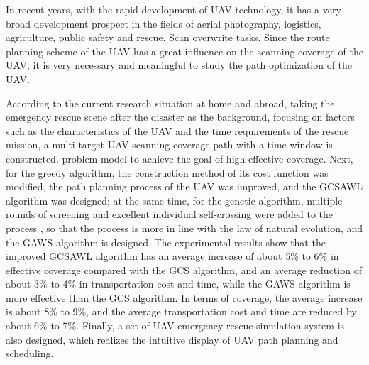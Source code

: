 \begin{eabstract}
In recent years, with the rapid development of UAV technology, it has a very broad development prospect in the fields of aerial photography, logistics, agriculture, public safety and rescue. Scan overwrite tasks. Since the route planning scheme of the UAV has a great influence on the scanning coverage of the UAV, it is very necessary and meaningful to study the path optimization of the UAV.


According to the current research situation at home and abroad, taking the emergency rescue scene after the disaster as the background, focusing on factors such as the characteristics of the UAV and the time requirements of the rescue mission, a multi-target UAV scanning coverage path with a time window is constructed. problem model to achieve the goal of high effective coverage. Next, for the greedy algorithm, the construction method of its cost function was modified, the path planning process of the UAV was improved, and the GCSAWL algorithm was designed; at the same time, for the genetic algorithm, multiple rounds of screening and excellent individual self-crossing were added to the process , so that the process is more in line with the law of natural evolution, and the GAWS algorithm is designed. The experimental results show that the improved GCSAWL algorithm has an average increase of about 5\% to 6\% in effective coverage compared with the GCS algorithm, and an average reduction of about 3\% to 4\% in transportation cost and time, while the GAWS algorithm is more effective than the GCS algorithm. In terms of coverage, the average increase is about 8\% to 9\%, and the average transportation cost and time are reduced by about 6\% to 7\%. Finally, a set of UAV emergency rescue simulation system is also designed, which realizes the intuitive display of UAV path planning and scheduling.
\end{eabstract}
